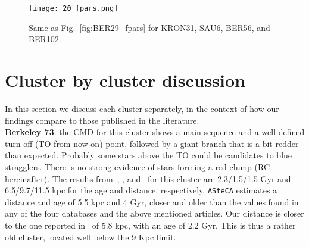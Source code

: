 \documentclass{aa}
\begin{document}
\begin{appendix}
 \begin{figure*}
  \centering
  \texttt{[image: 20\_fpars.png]}
  \caption{Same as Fig.~\ref{fig:BER29_fpars} for KRON31, SAU6, BER56, and BER102.}
  \label{fig:20fpars}
 \end{figure*}


\FloatBarrier
\section{Cluster by cluster discussion}
 \label{app:indiv_clusters}

  In this section we discuss each cluster separately, in the context of how our
  findings compare to those published in the literature.\\

  \noindent \textbf{Berkeley 73}: the CMD for this cluster shows a main sequence
  and a well defined turn-off (TO from now on) point, followed by a giant branch
  that is a bit redder than expected. Probably some stars above the TO could be
  candidates to blue stragglers. There is no strong evidence of stars forming a
  red clump (RC hereinafter).
  The results from~\cite{Ortolani_2005}, \cite{Carraro_2005},
  and~\cite{Carraro_2007_oldOC} for this cluster are 2.3/1.5/1.5 Gyr and
  6.5/9.7/11.5 kpc for the age and distance, respectively.
  \texttt{ASteCA} estimates a distance and age of 5.5 kpc and 4 Gyr,
  closer and older than the values found in any of the four databases and the
  above mentioned articles. Our distance is closer to the one reported
  in~\cite{Dias_2021} of 5.8 kpc, with an age of 2.2 Gyr. This is thus a
  rather old cluster, located well below the 9 Kpc limit.\\


\end{appendix}
\end{document}
